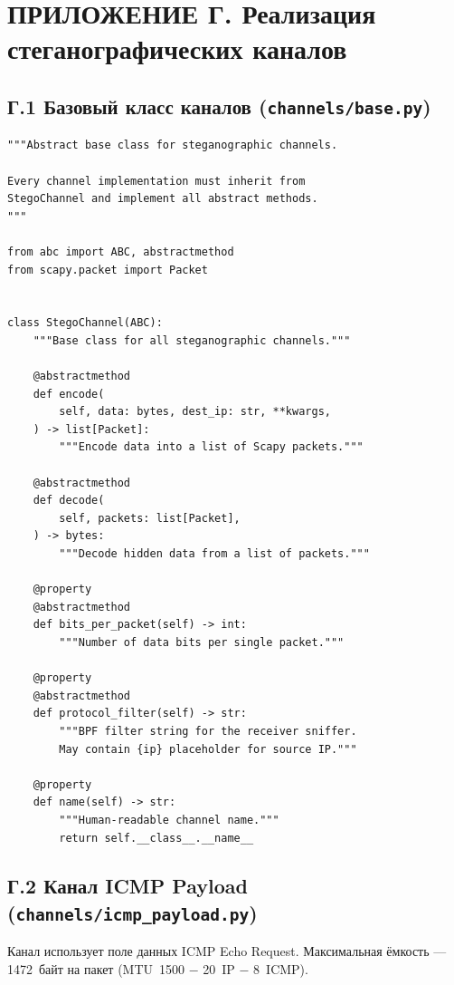 \newpage
\section*{ПРИЛОЖЕНИЕ Г. Реализация стеганографических каналов}

\subsection*{Г.1 Базовый класс каналов (\texttt{channels/base.py})}

\begin{lstlisting}[style=appendixcode]
"""Abstract base class for steganographic channels.

Every channel implementation must inherit from
StegoChannel and implement all abstract methods.
"""

from abc import ABC, abstractmethod
from scapy.packet import Packet


class StegoChannel(ABC):
    """Base class for all steganographic channels."""

    @abstractmethod
    def encode(
        self, data: bytes, dest_ip: str, **kwargs,
    ) -> list[Packet]:
        """Encode data into a list of Scapy packets."""

    @abstractmethod
    def decode(
        self, packets: list[Packet],
    ) -> bytes:
        """Decode hidden data from a list of packets."""

    @property
    @abstractmethod
    def bits_per_packet(self) -> int:
        """Number of data bits per single packet."""

    @property
    @abstractmethod
    def protocol_filter(self) -> str:
        """BPF filter string for the receiver sniffer.
        May contain {ip} placeholder for source IP."""

    @property
    def name(self) -> str:
        """Human-readable channel name."""
        return self.__class__.__name__
\end{lstlisting}

\subsection*{Г.2 Канал ICMP Payload (\texttt{channels/icmp\_payload.py})}

Канал использует поле данных ICMP Echo Request. Максимальная ёмкость ---
1472~байт на пакет (MTU~1500 $-$ 20~IP $-$ 8~ICMP).

